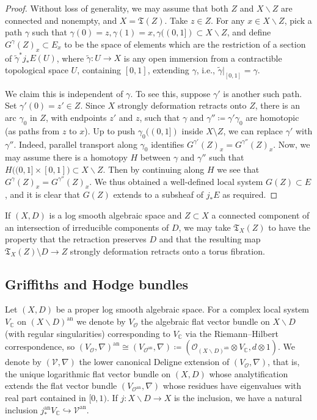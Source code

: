 \documentclass{amsart}
\newcommand{\bs}{\backslash}
\newcommand{\an}{\operatorname{an}}
\theoremstyle{definition}
\theoremstyle{remark}
\def\bC{\mathbb{C}}
\def\cO{\mathcal{O}}
\def\cV{\mathcal{V}}
\def\fT{\mathfrak{T}}
\def\an{\mathrm{an}}
\def\fT{\mathfrak{T}}
\numberwithin{equation}{section}
\begin{document}
\begin{proof}
Without loss of generality, we may assume that both $Z$ and $X\bs Z$ are connected and nonempty, and $X=\fT(Z)$. Take $z\in Z$.  For any $x\in X\bs Z$, pick a path $\gamma$ such that $\gamma(0)=z,\gamma(1)=x,\gamma((0,1])\subset X\bs Z$, and define $G^\gamma(Z)_{x}\subset E_{x}$
to be the space of elements which are the restriction of a section of $\tilde{\gamma}^*j_*E(U)$, where $\tilde{\gamma} \colon U \to X$ is any open immersion from a contractible topological space $U$, containing $[0,1]$, extending $\gamma$, i.e., $\tilde{\gamma}|_{[0,1]}=\gamma$.  

We claim this is independent of $\gamma$. To see this, suppose $\gamma'$ is another such path. Set $\gamma'(0)=z' \in Z$.
Since $X$ strongly deformation retracts onto $Z$, there is an arc $\gamma_0$ in $Z$, with endpoints $z'$ and $z$, such that $\gamma$ and $\gamma'' \coloneqq  \gamma' \gamma_0$ are homotopic (as paths from $z$ to $x$). Up to push $\gamma_{0}((0,1])$ inside $X \setminus Z$,  we can replace $\gamma'$ with $\gamma''$. Indeed, parallel transport along $\gamma_0$ identifies $G^{\gamma'}(Z)_x = G^{\gamma''}(Z)_x$. Now,
we may assume there is a homotopy $H$ between $\gamma$ and $\gamma''$ such that $H\big((0,1]\times [0,1]\big)\subset X\bs Z$. Then by continuing along $H$ we see that $G^\gamma(Z)_x=G^{\gamma''}(Z)_x$. We thus obtained a well-defined local system $G(Z)\subset E$, and it is clear that $G(Z)$ extends to a subsheaf of $j_*E$ as required.
\end{proof}

If $(X,D)$ is a log smooth algebraic space and $Z\subset X$ a connected component of an intersection of irreducible components of $D$, we may take $\fT_X(Z)$ to have the property that the retraction preserves $D$ and that the resulting map $\fT_X(Z)\setminus D\to Z$ strongly deformation retracts onto a torus fibration.




\subsection{Griffiths and Hodge bundles}\label{subsect:G/H bundles}
Let $(X,D)$ be a proper log smooth algebraic space.  For a complex local system $V_\bC$ on $(X\bs D)^\an$ we denote by $V_\cO$ the algebraic flat vector bundle on $X\bs D$ (with regular singularities) corresponding to $V_\bC$ via the Riemann--Hilbert correspondence, so $(V_\cO,\nabla)^\an\cong (V_{\cO^\an},\nabla)\coloneqq  (\cO_{(X\bs D)^\an}\otimes V_\bC,d\otimes 1)$.  We denote by $(\cV,\nabla)$ the lower canonical Deligne extension of $(V_\cO,\nabla)$, that is, the unique logarithmic flat vector bundle on $(X,D)$ whose analytification extends the flat vector bundle $(V_{\cO^\an},\nabla)$ whose residues have eigenvalues with real part contained in $[0,1)$. If $j:X\bs D\to X$ is the inclusion, we have a natural inclusion
$j^\an_*V_\bC\hookrightarrow \cV^\an$.
\end{document}
